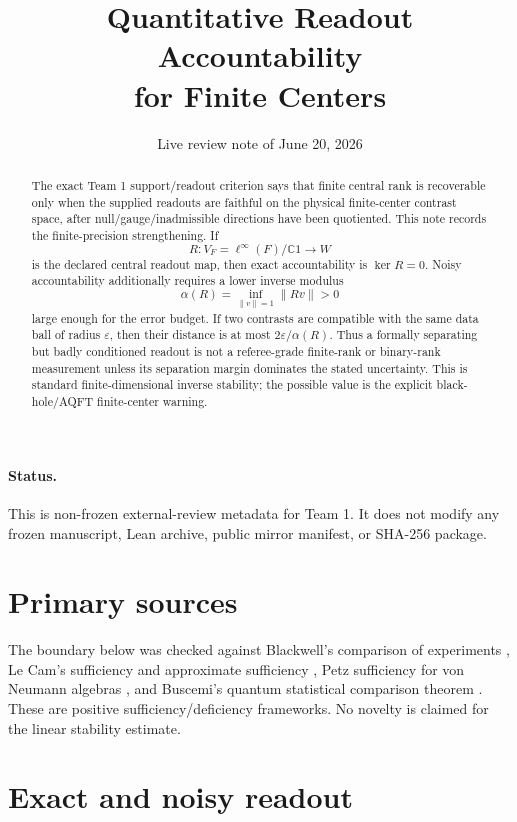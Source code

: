 \documentclass[12pt]{article}
\title{Quantitative Readout Accountability\\
for Finite Centers}
\author{}
\date{Live review note of June 20, 2026}
\theoremstyle{remark}
\begin{document}
\maketitle

\begin{abstract}
The exact Team 1 support/readout criterion says that finite central rank is
recoverable only when the supplied readouts are faithful on the physical
finite-center contrast space, after null/gauge/inadmissible directions have
been quotiented.  This note records the finite-precision strengthening.  If
\[
  R:V_F=\ell^\infty(F)/\mathbb C1\longrightarrow W
\]
is the declared central readout map, then exact accountability is
\(\ker R=0\).  Noisy accountability additionally requires a lower inverse
modulus
\[
  \alpha(R)=\inf_{\|v\|=1}\|Rv\|>0
\]
large enough for the error budget.  If two contrasts are compatible with the
same data ball of radius \(\varepsilon\), then their distance is at most
\(2\varepsilon/\alpha(R)\).  Thus a formally separating but badly conditioned
readout is not a referee-grade finite-rank or binary-rank measurement unless
its separation margin dominates the stated uncertainty.  This is standard
finite-dimensional inverse stability; the possible value is the explicit
black-hole/AQFT finite-center warning.
\end{abstract}

\paragraph{Status.}
This is non-frozen external-review metadata for Team 1.  It does not modify
any frozen manuscript, Lean archive, public mirror manifest, or SHA-256
package.

\section{Primary sources}

The boundary below was checked against Blackwell's comparison of experiments
\cite{Blackwell1951,Blackwell1953}, Le Cam's sufficiency and approximate
sufficiency \cite{LeCam1964}, Petz sufficiency for von Neumann algebras
\cite{Petz1986}, and Buscemi's quantum statistical comparison theorem
\cite{Buscemi2012}.  These are positive sufficiency/deficiency frameworks.
No novelty is claimed for the linear stability estimate.

\section{Exact and noisy readout}
\end{document}
